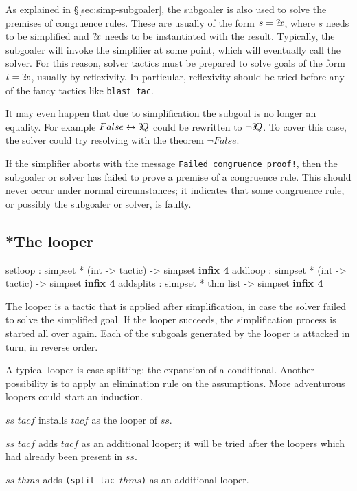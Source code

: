\medskip

As explained in \S\ref{sec:simp-subgoaler}, the subgoaler is also used
to solve the premises of congruence rules.  These are usually of the
form $s = {?\!x}$, where $s$ needs to be simplified and ${?\!x}$
needs to be instantiated with the result.  Typically, the subgoaler
will invoke the simplifier at some point, which will eventually call
the solver.  For this reason, solver tactics must be prepared to solve
goals of the form $t = {?\!x}$, usually by reflexivity.  In
particular, reflexivity should be tried before any of the fancy
tactics like {\tt blast_tac}.

It may even happen that due to simplification the subgoal is no longer
an equality.  For example $False \leftrightarrow {?\!Q}$ could be rewritten to
$\neg{?\!Q}$.  To cover this case, the solver could try resolving
with the theorem $\neg False$.

\medskip

\begin{warn}
  If the simplifier aborts with the message \texttt{Failed congruence
    proof!}, then the subgoaler or solver has failed to prove a
  premise of a congruence rule.  This should never occur under normal
  circumstances; it indicates that some congruence rule, or possibly
  the subgoaler or solver, is faulty.
\end{warn}


\subsection{*The looper}\label{sec:simp-looper}
\begin{ttbox}
setloop   : simpset * (int -> tactic) -> simpset \hfill{\bf infix 4}
addloop   : simpset * (int -> tactic) -> simpset \hfill{\bf infix 4}
addsplits : simpset * thm list -> simpset \hfill{\bf infix 4}
\end{ttbox}

The looper is a tactic that is applied after simplification, in case
the solver failed to solve the simplified goal.  If the looper
succeeds, the simplification process is started all over again.  Each
of the subgoals generated by the looper is attacked in turn, in
reverse order.

A typical looper is case splitting: the expansion of a conditional.
Another possibility is to apply an elimination rule on the
assumptions.  More adventurous loopers could start an induction.

\begin{ttdescription}
  
\item[$ss$ \ttindexbold{setloop} $tacf$] installs $tacf$ as the looper
  of $ss$.
  
\item[$ss$ \ttindexbold{addloop} $tacf$] adds $tacf$ as an additional
  looper; it will be tried after the loopers which had already been
  present in $ss$.
  
\item[$ss$ \ttindexbold{addsplits} $thms$] adds
  \texttt{(split_tac~$thms$)} as an additional looper.

\end{ttdescription}



